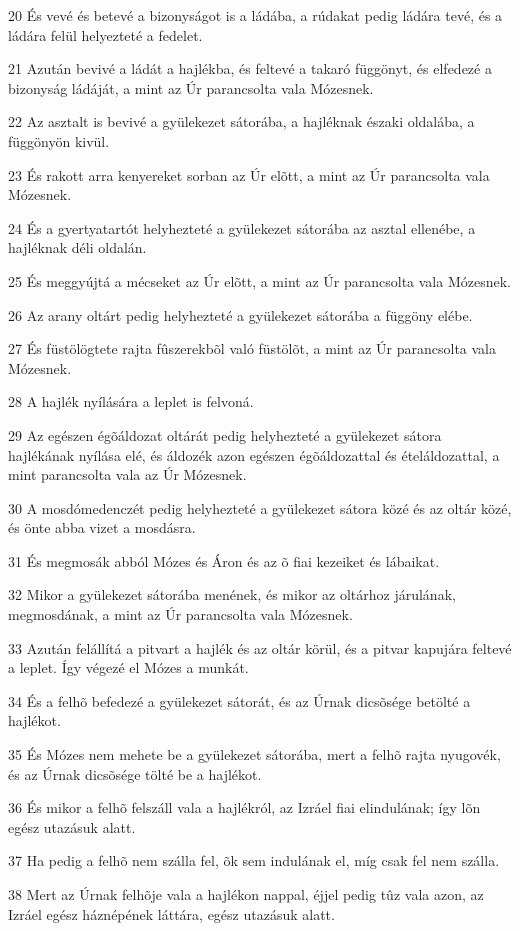 \par 20 És vevé és betevé a bizonyságot is a ládába, a rúdakat pedig ládára tevé, és a ládára felül helyezteté a fedelet.
\par 21 Azután bevivé a ládát a hajlékba, és feltevé a takaró függönyt, és elfedezé a bizonyság ládáját, a mint az Úr parancsolta vala Mózesnek.
\par 22 Az asztalt is bevivé a gyülekezet sátorába, a hajléknak északi oldalába, a függönyön kivül.
\par 23 És rakott arra kenyereket sorban az Úr elõtt, a mint az Úr parancsolta vala Mózesnek.
\par 24 És a gyertyatartót helyhezteté a gyülekezet sátorába az asztal ellenébe, a hajléknak déli oldalán.
\par 25 És meggyújtá a mécseket az Úr elõtt, a mint az Úr parancsolta vala Mózesnek.
\par 26 Az arany oltárt pedig helyhezteté a gyülekezet sátorába a függöny elébe.
\par 27 És füstölögtete rajta fûszerekbõl való füstölõt, a mint az Úr parancsolta vala Mózesnek.
\par 28 A hajlék nyílására a leplet is felvoná.
\par 29 Az egészen égõáldozat oltárát pedig helyhezteté a gyülekezet sátora hajlékának nyílása elé, és áldozék azon egészen égõáldozattal és ételáldozattal, a mint parancsolta vala az Úr Mózesnek.
\par 30 A mosdómedenczét pedig helyhezteté a gyülekezet sátora közé és az oltár közé, és önte abba vizet a mosdásra.
\par 31 És megmosák abból Mózes és Áron és az õ fiai kezeiket és lábaikat.
\par 32 Mikor a gyülekezet sátorába menének, és mikor az oltárhoz járulának, megmosdának, a mint az Úr parancsolta vala Mózesnek.
\par 33 Azután felállítá a pitvart a hajlék és az oltár körül, és a pitvar kapujára feltevé a leplet. Így végezé el Mózes a munkát.
\par 34 És a felhõ befedezé a gyülekezet sátorát, és az Úrnak dicsõsége betölté a hajlékot.
\par 35 És Mózes nem mehete be a gyülekezet sátorába, mert a felhõ rajta nyugovék, és az Úrnak dicsõsége tölté be a hajlékot.
\par 36 És mikor a felhõ felszáll vala a hajlékról, az Izráel fiai elindulának; így lõn egész utazásuk alatt.
\par 37 Ha pedig a felhõ nem szálla fel, õk sem indulának el, míg csak fel nem szálla.
\par 38 Mert az Úrnak felhõje vala a hajlékon nappal, éjjel pedig tûz vala azon, az Izráel egész háznépének láttára, egész utazásuk alatt.




